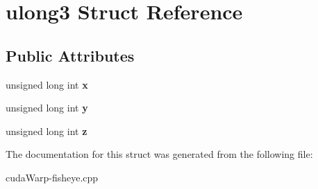 \hypertarget{structulong3}{}\section{ulong3 Struct Reference}
\label{structulong3}
\subsection*{Public Attributes}
\begin{DoxyCompactItemize}
\item 
unsigned long int {\bfseries x}\hypertarget{structulong3_aa0c067885c74609ec302bc940d235c49}{}\label{structulong3_aa0c067885c74609ec302bc940d235c49}

\item 
unsigned long int {\bfseries y}\hypertarget{structulong3_afeb5efb781d085a4faf8e79c21cc80d9}{}\label{structulong3_afeb5efb781d085a4faf8e79c21cc80d9}

\item 
unsigned long int {\bfseries z}\hypertarget{structulong3_a9a98a6b839dda2874d3de90c0d11e414}{}\label{structulong3_a9a98a6b839dda2874d3de90c0d11e414}

\end{DoxyCompactItemize}


The documentation for this struct was generated from the following file\+:\begin{DoxyCompactItemize}
\item 
cuda\+Warp-\/fisheye.\+cpp\end{DoxyCompactItemize}
